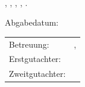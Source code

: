 
\thispagestyle{empty}

\ \vfill

\noindent%
\myName, \emph{\myTitle}, \myDegree, \myUni, .

\bigskip

\noindent
Abgabedatum: 

\bigskip

\noindent\begin{tabular}{@{}l@{~}l@{}}
	Betreuung: & \myProf, \mySupervisor \\
	Erstgutachter: & \myProf \\
	Zweitgutachter: & \myOtherProf
\end{tabular}

\bigskip

\noindent%
\myDepartmentDE \\
\myFacultyDE \\
\myUni









